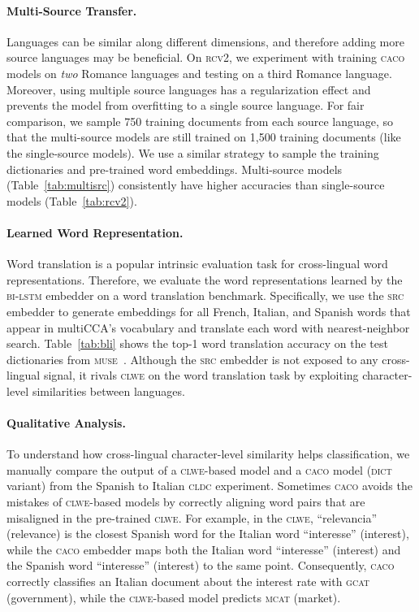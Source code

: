 \documentclass[letterpaper]{article} %
\newcommand{\citep}{\cite}
\newcommand{\abr}[1]{\textsc{#1}}
\newcommand{\name}[0]{\textsc{caco}}
\begin{document}
\paragraph{Multi-Source Transfer.}
Languages can be similar along different dimensions, and therefore adding more
source languages may be beneficial.
On \abr{rcv2}, we experiment with training \name{} models on \emph{two} Romance
languages and testing on a third Romance language.
Moreover, using multiple source languages has a regularization
effect and prevents the model from overfitting to a single source language.
For fair comparison, we sample 750 training documents from each source
language, so that the multi-source models are still trained on 1,500 training
documents (like the single-source models).  We use a similar strategy to sample
the training dictionaries and pre-trained word embeddings.  Multi-source models
(Table~\ref{tab:multisrc}) consistently have higher accuracies than single-source models
(Table~\ref{tab:rcv2}).

\paragraph{Learned Word Representation.}
Word translation is a popular intrinsic evaluation task for cross-lingual 
word representations.
Therefore, we evaluate the word representations learned by the \abr{bi-lstm}
embedder on a word translation benchmark.
Specifically, we use the \abr{src} embedder to generate embeddings for all
French, Italian, and Spanish words that appear in multiCCA's vocabulary and 
translate each word with nearest-neighbor search.
Table~\ref{tab:bli} shows the top-1 word translation accuracy on the test
dictionaries from \abr{muse}~\citep{conneau-18}.
Although the \abr{src} embedder is not exposed to any cross-lingual signal, it
rivals \abr{clwe} on the word translation task by exploiting character-level
similarities between languages.

\paragraph{Qualitative Analysis.}
To understand how cross-lingual character-level similarity helps
classification, we manually compare the output of a \abr{clwe}-based model and
a \name{} model (\abr{dict} variant) from the Spanish to Italian \abr{cldc}
experiment.
Sometimes \name{} avoids the mistakes of \abr{clwe}-based models by correctly
aligning word pairs that are misaligned in the pre-trained \abr{clwe}.
For example, in the \abr{clwe}, ``relevancia'' (relevance) is the closest
Spanish word for the Italian word ``interesse'' (interest), while the
\abr{caco} embedder maps both the Italian word ``interesse'' (interest) and the
Spanish word ``interesse'' (interest) to the same point.  Consequently,
\abr{caco} correctly classifies an Italian document about the interest rate
with \abr{gcat} (government), while the \abr{clwe}-based model predicts
\abr{mcat} (market).
\end{document}
